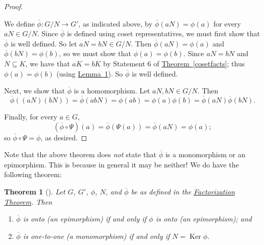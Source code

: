 \documentclass[10pt,]{book}
\theoremstyle{plain}
\newtheorem{theorem}{Theorem}[section]
\theoremstyle{definition}
\theoremstyle{definition}
\theoremstyle{definition}
\theoremstyle{definition}
\numberwithin{equation}{section}
\def\phibar{\overline{\phi}}
\DeclareMathOperator{\Ker}{Ker}
\begin{document}
\begin{proof}\hypertarget{proof-51}{}
We define \(\phibar: G/N\to G'\), as indicated above, by \(\phibar(aN)=\phi(a)\) for every \(aN\in G/N\). Since \(\phibar\) is defined using coset representatives, we must first show that \(\phibar\) is well defined. So let \(aN=bN\in G/N\). Then \(\phibar(aN)=\phi(a)\) and \(\phibar(bN)=\phi(b)\), so we must show that \(\phi(a)=\phi(b)\). Since \(aN=bN\) and \(N\subseteq K\), we have that \(aK=bK\) by Statement 6 of \hyperref[cosetfacts]{Theorem~\ref{cosetfacts}}; thus \(\phi(a)=\phi(b)\) (using \hyperref[kermean]{Lemma~1}). So \(\phibar\) is well defined.%
\par
Next, we show that \(\phibar\) is a homomorphism. Let \(aN,bN\in
G/N\). Then%
\begin{equation*}
\phibar((aN)(bN))=\phibar(abN)=\phi(ab)=\phi(a)\phi(b)=\phibar(aN)\phibar(bN).
\end{equation*}
%
\par
Finally, for every \(a\in G\),%
\begin{equation*}
(\phibar \circ
\Psi)(a)=\phibar(\Psi(a))=\phibar(aN)=\phi(a);
\end{equation*}
so \(\phibar \circ
\Psi = \phi\), as desired.%
\end{proof}
Note that the above theorem does \emph{not} state that \(\phibar\) is a monomorphism or an epimorphism. This is because in general it may be neither! We do have the following theorem:%
\begin{theorem}[{}]\label{epimono}
Let \(G\), \(G'\), \(\phi\), \(N\), and \(\phibar\) be as defined in the  \hyperref[facthm]{Factorization Theorem}. Then \leavevmode%
\begin{enumerate}
\item\hypertarget{li-509}{}\(\phibar\) is onto (an epimorphism) if and only if \(\phi\) is onto (an epimorphism); and%
\item\hypertarget{li-510}{}\(\phibar\) is one-to-one (a monomorphism) if and only if \(N=\Ker
\phi\).%
\end{enumerate}
%
\end{theorem}
\end{document}
